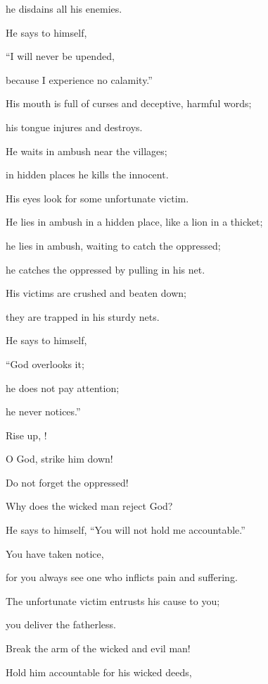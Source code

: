 {\par }{\Q he disdains
all
his enemies.
\par }{\Q {}He says
to himself,
\par }{\Q “I will never be upended,
\par }{\Q because I experience
no
calamity.”
\par }{\Q {}His mouth
is full
of curses
and deceptive,
harmful words;
\par }{\Q his tongue
injures
and destroys.
\par }{\Q {}He waits
in ambush
near the villages;
\par }{\Q in hidden places
he kills
the innocent.
\par }{\Q His eyes
look for
some unfortunate victim.
\par }{\Q {}He lies in ambush
in a hidden place,
like a lion
in a thicket;
\par }{\Q he lies in ambush,
waiting to catch
the oppressed;
\par }{\Q he catches
the oppressed
by pulling
in his net.
\par }{\Q {}His victims
are crushed
and beaten down;
\par }{\Q they are trapped
in his sturdy nets.
\par }{\Q {}He says
to himself,
\par }{\Q “God
overlooks
it;
\par }{\Q he does not
pay attention;
\par }{\Q he never notices.”
\par }{\Q {}Rise
up,
{}!

\par }{\Q O God,
strike
him down!

\par }{\Q Do not
forget
the oppressed!
\par }{\Q {}Why
does the wicked
man reject
God?

\par }{\Q He says
to himself, “You will not
hold me accountable.”
\par }{\Q {}You have taken notice,
\par }{\Q for
you
always see
one who inflicts
pain
and suffering.
\par }{\Q The unfortunate victim
entrusts
his cause
to
you;

\par }{\Q you
deliver
the fatherless.
\par }{\Q {}Break
the arm
of the wicked
and evil
man!
\par }{\Q Hold him accountable
for his wicked
deeds,

}
